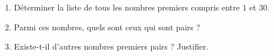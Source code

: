 \begin{exo}{}
	\nline
	\begin{enumerate}
		\item Déterminer la liste de tous les nombres premiers compris entre $1$ et $30$.
		\item Parmi ces nombres, quels sont ceux qui sont pairs ?
		\item Existe-t-il d'autres nombres premiers pairs ? Justifier.
	\end{enumerate}
\end{exo}
